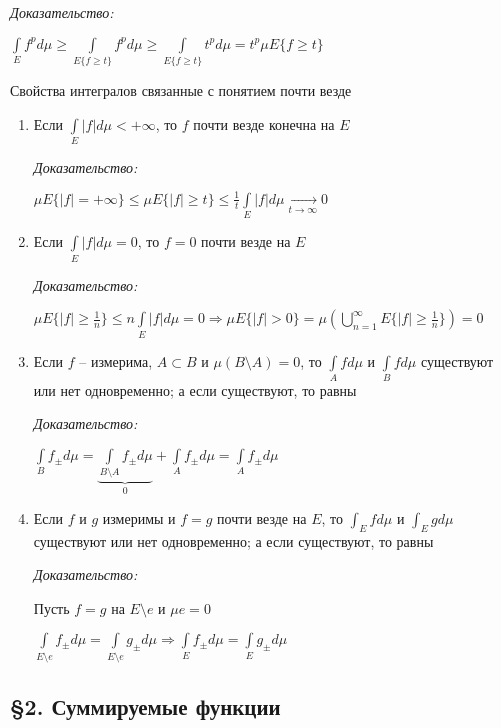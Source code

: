 \documentclass[12pt]{article}
\begin{document}
\textit{Доказательство:}

$\int\limits_E f^pd\mu \geq \int\limits_{E\{f \geq t\}} f^pd\mu \geq \int\limits_{E\{f \geq t\}} t^pd\mu = t^p \mu E\{f \geq t\}$

\begin{theo}{Свойства интегралов связанные с понятием почти везде}
    \begin{enumerate}
        \item Если $\int\limits_E |f|d\mu < + \infty$, то $f$ почти везде конечна на $E$
        
        \textit{Доказательство:}

        $\mu E\{|f| = + \infty\} \leq \mu E\{|f| \geq t\} \leq \frac{1}{t} \int\limits_E |f|d\mu \xrightarrow[t \to \infty]{} 0$

        \item Если $\int\limits_E |f|d\mu = 0$, то $f = 0$ почти везде на $E$
        
        \textit{Доказательство:}

        $\mu E\{|f| \geq \frac{1}{n}\} \leq n\int\limits_E |f|d\mu = 0 \Rightarrow \mu E\{|f| > 0\} = \mu (\bigcup\limits_{n = 1}^\infty E\{|f| \geq \frac{1}{n}\}) = 0$

        \item Если $f$ -- измерима, $A \subset B$ и $\mu(B \setminus A) = 0$, то $\int\limits_A fd\mu$ и $\int\limits_B fd\mu$ существуют или нет одновременно; а если существуют, то равны
        
        \textit{Доказательство:}

        $\int\limits_B f_\pm d\mu = \underbrace{\int\limits_{B \setminus A} f_\pm d\mu}_{0} + \int\limits_A f_\pm d\mu = \int\limits_A f_\pm d\mu$

        \item Если $f$ и $g$ измеримы и $f = g$ почти везде на $E$, то $\int_E fd\mu$ и $\int_E gd\mu$ существуют или нет одновременно; а если существуют, то равны
        
        \textit{Доказательство:}

        Пусть $f = g$ на $E \setminus e$ и $\mu e = 0$

        $\int\limits_{E \setminus e} f_\pm d\mu = \int\limits_{E \setminus e} g_\pm d\mu \Rightarrow \int\limits_E f_\pm d\mu = \int\limits_E g_\pm d\mu$
    \end{enumerate}
\end{theo}

\newpage

\subsection{\S 2. Суммируемые функции}
\end{document}
